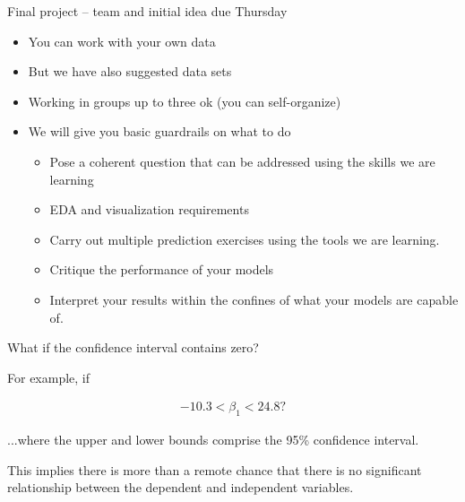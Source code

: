 \documentclass[aspectratio=169]{beamer}
\begin{document}
\begin{frame}{Final project -- team and initial idea due Thursday}

\begin{itemize}
\item You can work with your own data
\item But we have also suggested data sets
\item Working in groups up to three ok (you can self-organize)
\item We will give you basic guardrails on what to do
\begin{itemize}
\item Pose a coherent question that can be addressed using the skills we are learning
\item EDA and visualization requirements
\item Carry out multiple prediction exercises using the tools we are learning.
\item Critique the performance of your models
\item Interpret your results within the confines of what your models are capable of.
\end{itemize}
\end{itemize}

\end{frame}

\begin{frame}{What if the confidence interval contains zero?}

For example, if
   
\begin{align*}
  -10.3 < \beta_1 < 24.8?
\end{align*}

...where the upper and lower bounds comprise the 95\% confidence interval.

\pause

\vspace{5mm}
This implies there is more than a remote chance that there is no significant relationship between the dependent and independent variables.  

\end{frame}
\end{document}
